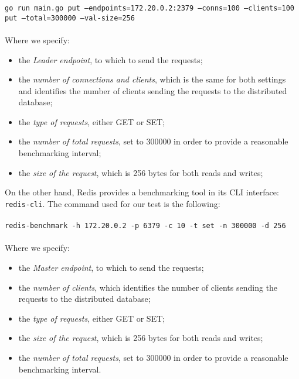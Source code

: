 \texttt{go run main.go put --endpoints=172.20.0.2:2379 --conns=100 --clients=100 put
--total=300000 --val-size=256} \\ \\
Where we specify:
\begin{itemize}
	\item the \textit{Leader endpoint}, to which to send the requests;
	\item the \textit{number of connections and clients}, which is the same for both settings and identifies the number of clients sending the requests to the distributed database;
	\item the \textit{type of requests}, either GET or SET;
	\item the \textit{number of total requests}, set to 300000 in order to provide a reasonable benchmarking interval;
	\item the \textit{size of the request}, which is 256 bytes for both reads and writes;
\end{itemize}
On the other hand, Redis provides a benchmarking tool in its CLI interface: \texttt{redis-cli}. The command used for our test is the following: \\ \\
\texttt{redis-benchmark -h 172.20.0.2 -p 6379 -c 10 -t set -n 300000 -d 256} \\ \\
Where we specify:
\begin{itemize}
	\item the \textit{Master endpoint}, to which to send the requests;
	\item the \textit{number of clients}, which identifies the number of clients sending the requests to the distributed database;
	\item the \textit{type of requests}, either GET or SET;
	\item the \textit{size of the request}, which is 256 bytes for both reads and writes;
	\item the \textit{number of total requests}, set to 300000 in order to provide a reasonable benchmarking interval.
\end{itemize}

